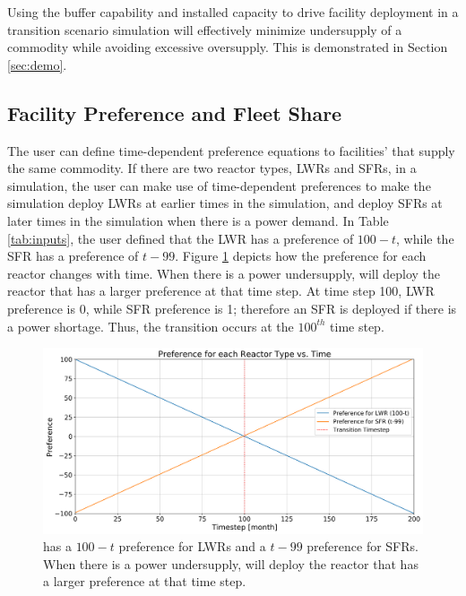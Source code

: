 Using the buffer capability and  
installed capacity to drive facility deployment in a transition 
scenario simulation will effectively minimize undersupply of a 
commodity while avoiding excessive oversupply. 
This is demonstrated in Section \ref{sec:demo}. 

\subsection{Facility Preference and Fleet Share}
\label{sec:pref}
The user can define time-dependent preference equations to facilities'  
that supply the same commodity. 
If there are two reactor types, \glspl{LWR} and \glspl{SFR}, in a simulation, 
the user can make use of time-dependent 
preferences to make the simulation deploy \glspl{LWR} at earlier times 
in the simulation, and deploy SFRs at later times in the 
simulation when there is a power demand. 
In Table \ref{tab:inputs}, 
the user defined that the \gls{LWR} has a preference of $100-t$, while 
the SFR has a preference of $t-99$. 
Figure \ref{fig:prefplot} depicts how the preference for each reactor changes 
with time. 
When there is a power undersupply, \deploy will deploy the reactor that has a
larger preference at that time step.
At time step 100, \gls{LWR} preference is 0, while SFR preference is 1; 
therefore an SFR is deployed if there is a power shortage. 
Thus, the transition occurs at the $100^{th}$ time step.

\begin{figure}[]
	\begin{center}
		\includegraphics[width=\linewidth]{./figures/prefplot}
	\end{center}	
		\caption{\deploy has a $100-t$ preference for \glspl{LWR} and a $t-99$ preference for SFRs.
		When there is a power undersupply, \deploy will deploy the reactor that has a
		larger preference at that time step.}
	\label{fig:prefplot}
\end{figure}

